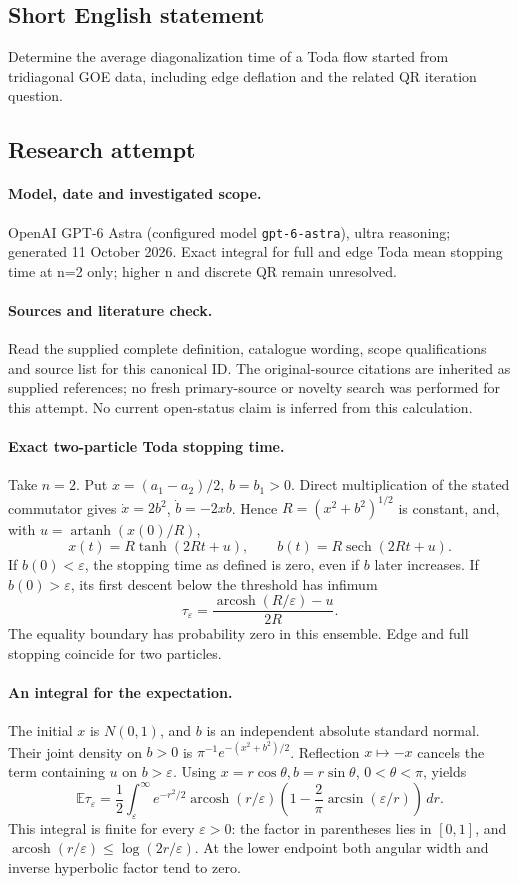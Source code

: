 \documentclass[11pt]{article}
\begin{document}
\subsection{Short English statement}
Determine the average diagonalization time of a Toda flow started from tridiagonal GOE data, including edge deflation and the related QR iteration question.
\subsection{Research attempt}
\paragraph{Model, date and investigated scope.}
OpenAI GPT-6 Astra (configured model \texttt{gpt-6-astra}), ultra reasoning; generated 11 October 2026. Exact integral for full and edge Toda mean stopping time at n=2 only; higher n and discrete QR remain unresolved.

\paragraph{Sources and literature check.}
Read the supplied complete definition, catalogue wording, scope qualifications and source list for this canonical ID. The original-source citations are inherited as supplied references; no fresh primary-source or novelty search was performed for this attempt. No current open-status claim is inferred from this calculation.

\paragraph{Exact two-particle Toda stopping time.}Take \(n=2\). Put \(x=(a_1-a_2)/2\), \(b=b_1>0\). Direct multiplication of the stated commutator gives \(\dot x=2b^2\), \(\dot b=-2xb\). Hence \(R=(x^2+b^2)^{1/2}\) is constant, and, with \(u=\operatorname{artanh}(x(0)/R)\),
\[x(t)=R\tanh(2Rt+u),\qquad b(t)=R\operatorname{sech}(2Rt+u).\]
If \(b(0)<\varepsilon\), the stopping time as defined is zero, even if \(b\) later increases. If \(b(0)>\varepsilon\), its first descent below the threshold has infimum
\[\tau_\varepsilon=\frac{\operatorname{arcosh}(R/\varepsilon)-u}{2R}.\]
The equality boundary has probability zero in this ensemble. Edge and full stopping coincide for two particles.
\paragraph{An integral for the expectation.}The initial \(x\) is \(N(0,1)\), and \(b\) is an independent absolute standard normal. Their joint density on \(b>0\) is \(\pi^{-1}e^{-(x^2+b^2)/2}\). Reflection \(x\mapsto-x\) cancels the term containing \(u\) on \(b>\varepsilon\). Using \(x=r\cos\theta,b=r\sin\theta\), \(0<\theta<\pi\), yields
\[\mathbb E\tau_\varepsilon=\frac12\int_\varepsilon^\infty e^{-r^2/2}\operatorname{arcosh}(r/\varepsilon)
\left(1-\frac2\pi\arcsin(\varepsilon/r)\right)\,dr.\]
This integral is finite for every \(\varepsilon>0\): the factor in parentheses lies in \([0,1]\), and \(\operatorname{arcosh}(r/\varepsilon)\le\log(2r/\varepsilon)\). At the lower endpoint both angular width and inverse hyperbolic factor tend to zero.
\end{document}
